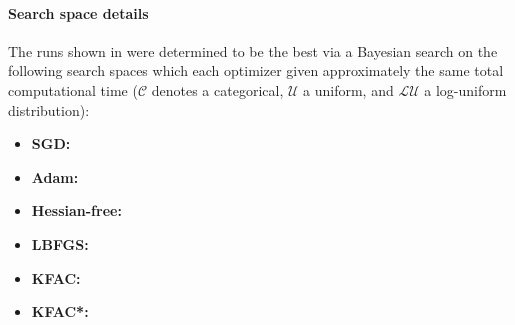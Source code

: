 \paragraph{Search space details} The runs shown in  were determined to be the best via a Bayesian search on the following search spaces which each optimizer given approximately the same total computational time ($\mathcal{C}$ denotes a categorical, $\mathcal{U}$ a uniform, and $\mathcal{LU}$ a log-uniform distribution):
\begin{itemize}
  \def\pathToRuns{kfac_pinns_exp/exp31_heat4d_mlp_tanh_256_bayes/tex/}
\item \textbf{SGD:} 
\item \textbf{Adam:} 
\item \textbf{Hessian-free:} 
\item \textbf{LBFGS:} 
\item \textbf{KFAC:} 
\item \textbf{KFAC*:} 
\end{itemize}

